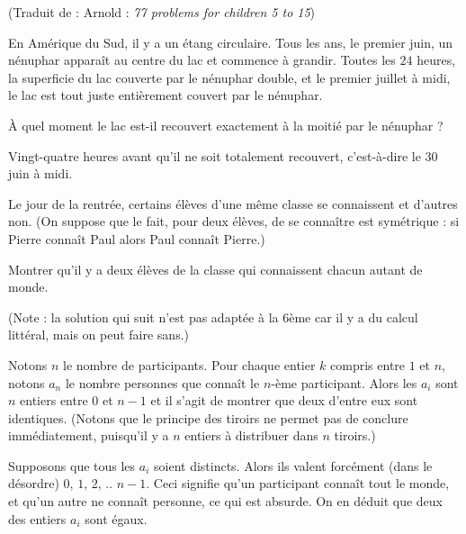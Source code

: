 \begin{exo}[Nénuphar]
(Traduit de : Arnold : \emph{77 problems for children 5 to 15})

En Amérique du Sud, il y a un étang circulaire. Tous les ans, le premier juin, un nénuphar apparaît au centre du lac et commence à grandir. Toutes les $24$ heures, la superficie du lac couverte par le nénuphar double, et le premier juillet à midi, le lac est tout juste entièrement couvert par le nénuphar.

À quel moment le lac est-il recouvert exactement à la moitié par le nénuphar ?


\begin{sol}
Vingt-quatre heures avant qu'il ne soit totalement recouvert, c'est-à-dire le 30 juin à midi.
\end{sol}

\end{exo}

\begin{exo}
Le jour de la rentrée, certains élèves d'une même classe se connaissent et d'autres non. (On suppose que le fait, pour deux élèves, de se connaître est symétrique : si Pierre connaît Paul alors Paul connaît Pierre.)

Montrer qu'il y a deux élèves de la classe qui connaissent chacun autant de monde.
\begin{sol}
(Note : la solution qui suit n'est pas adaptée à la 6ème car il y a du calcul littéral, mais on peut faire sans.) 

Notons $n$ le nombre de participants. Pour chaque entier $k$ compris entre $1$ et $n$, notons $a_n$ le nombre personnes que connaît le $n$-ème participant. Alors les $a_i$ sont $n$ entiers entre $0$ et $n-1$ et il s'agit de montrer que deux d'entre eux sont identiques. (Notons que le principe des tiroirs ne permet pas de conclure immédiatement, puisqu'il y a $n$ entiers à distribuer dans $n$ tiroirs.)

Supposons que tous les $a_i$ soient distincts. Alors ils valent forcément (dans le désordre) $0$, $1$, $2$, .. $n-1$. Ceci signifie qu'un participant connaît tout le monde, et qu'un autre ne connaît personne, ce qui est absurde. On en déduit que deux des entiers $a_i$ sont égaux.
\end{sol}
\end{exo}

